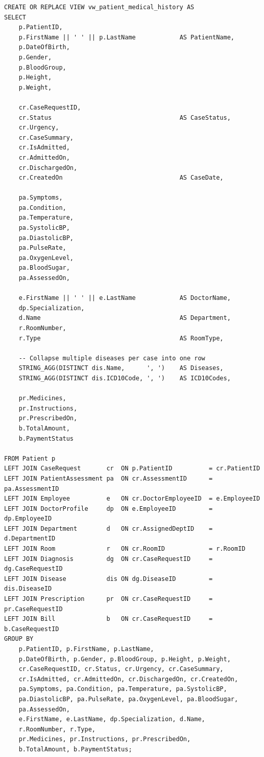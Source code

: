 \documentclass{article}
\begin{document}
\begin{lstlisting}
CREATE OR REPLACE VIEW vw_patient_medical_history AS
SELECT
    p.PatientID,
    p.FirstName || ' ' || p.LastName            AS PatientName,
    p.DateOfBirth,
    p.Gender,
    p.BloodGroup,
    p.Height,
    p.Weight,

    cr.CaseRequestID,
    cr.Status                                   AS CaseStatus,
    cr.Urgency,
    cr.CaseSummary,
    cr.IsAdmitted,
    cr.AdmittedOn,
    cr.DischargedOn,
    cr.CreatedOn                                AS CaseDate,

    pa.Symptoms,
    pa.Condition,
    pa.Temperature,
    pa.SystolicBP,
    pa.DiastolicBP,
    pa.PulseRate,
    pa.OxygenLevel,
    pa.BloodSugar,
    pa.AssessedOn,

    e.FirstName || ' ' || e.LastName            AS DoctorName,
    dp.Specialization,
    d.Name                                      AS Department,
    r.RoomNumber,
    r.Type                                      AS RoomType,

    -- Collapse multiple diseases per case into one row
    STRING_AGG(DISTINCT dis.Name,      ', ')    AS Diseases,
    STRING_AGG(DISTINCT dis.ICD10Code, ', ')    AS ICD10Codes,

    pr.Medicines,
    pr.Instructions,
    pr.PrescribedOn,
    b.TotalAmount,
    b.PaymentStatus

FROM Patient p
LEFT JOIN CaseRequest       cr  ON p.PatientID          = cr.PatientID
LEFT JOIN PatientAssessment pa  ON cr.AssessmentID      = pa.AssessmentID
LEFT JOIN Employee          e   ON cr.DoctorEmployeeID  = e.EmployeeID
LEFT JOIN DoctorProfile     dp  ON e.EmployeeID         = dp.EmployeeID
LEFT JOIN Department        d   ON cr.AssignedDeptID    = d.DepartmentID
LEFT JOIN Room              r   ON cr.RoomID            = r.RoomID
LEFT JOIN Diagnosis         dg  ON cr.CaseRequestID     = dg.CaseRequestID
LEFT JOIN Disease           dis ON dg.DiseaseID         = dis.DiseaseID
LEFT JOIN Prescription      pr  ON cr.CaseRequestID     = pr.CaseRequestID
LEFT JOIN Bill              b   ON cr.CaseRequestID     = b.CaseRequestID
GROUP BY
    p.PatientID, p.FirstName, p.LastName,
    p.DateOfBirth, p.Gender, p.BloodGroup, p.Height, p.Weight,
    cr.CaseRequestID, cr.Status, cr.Urgency, cr.CaseSummary,
    cr.IsAdmitted, cr.AdmittedOn, cr.DischargedOn, cr.CreatedOn,
    pa.Symptoms, pa.Condition, pa.Temperature, pa.SystolicBP,
    pa.DiastolicBP, pa.PulseRate, pa.OxygenLevel, pa.BloodSugar,
    pa.AssessedOn,
    e.FirstName, e.LastName, dp.Specialization, d.Name,
    r.RoomNumber, r.Type,
    pr.Medicines, pr.Instructions, pr.PrescribedOn,
    b.TotalAmount, b.PaymentStatus;
\end{lstlisting}
\end{document}
